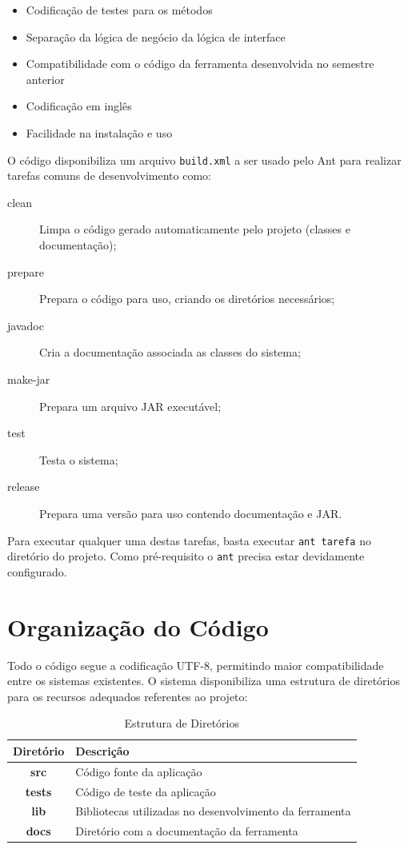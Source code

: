 \documentclass[a4paper,10pt]{report}
\begin{document}
\begin{itemize}
 \item Codificação de testes para os métodos
 \item Separação da lógica de negócio da lógica de interface
 \item Compatibilidade com o código da ferramenta desenvolvida no semestre anterior\cite{msnlab}
 \item Codificação em inglês
 \item Facilidade na instalação e uso
\end{itemize}

O código disponibiliza um arquivo \texttt{build.xml} a ser usado pelo Ant\cite{ant} para realizar tarefas comuns de desenvolvimento como:

\begin{description}
 \item[clean] Limpa o código gerado automaticamente pelo projeto (classes e documentação);
 \item[prepare] Prepara o código para uso, criando os diretórios necessários;
 \item[javadoc] Cria a documentação associada as classes do sistema;
 \item[make-jar] Prepara um arquivo JAR executável;
 \item[test] Testa o sistema;
 \item[release] Prepara uma versão para uso contendo documentação e JAR.
 \end{description}

Para executar qualquer uma destas tarefas, basta executar \texttt{ant tarefa} no diretório do projeto. Como pré-requisito o \texttt{ant} precisa estar devidamente configurado.

\section{Organização do Código}

Todo o código segue a codificação UTF-8, permitindo maior compatibilidade entre os sistemas existentes. O sistema disponibiliza uma estrutura de diretórios para os recursos adequados referentes ao projeto:

\begin{table}[h]
\centering
\caption{Estrutura de Diretórios}
        \begin{tabular}{|c|p{2in}|}
        \hline
        \textbf{Diretório} & \textbf{Descrição} \\ \hline
        \textbf{src} & Código fonte da aplicação \\ \hline
        \textbf{tests} & Código de teste da aplicação \\ \hline
        \textbf{lib} & Bibliotecas utilizadas no desenvolvimento da ferramenta \\ \hline
        \textbf{docs} & Diretório com a documentação da ferramenta \\ \hline
        \end{tabular}
\label{tab:diretorios}
\end{table} 
\end{document}
